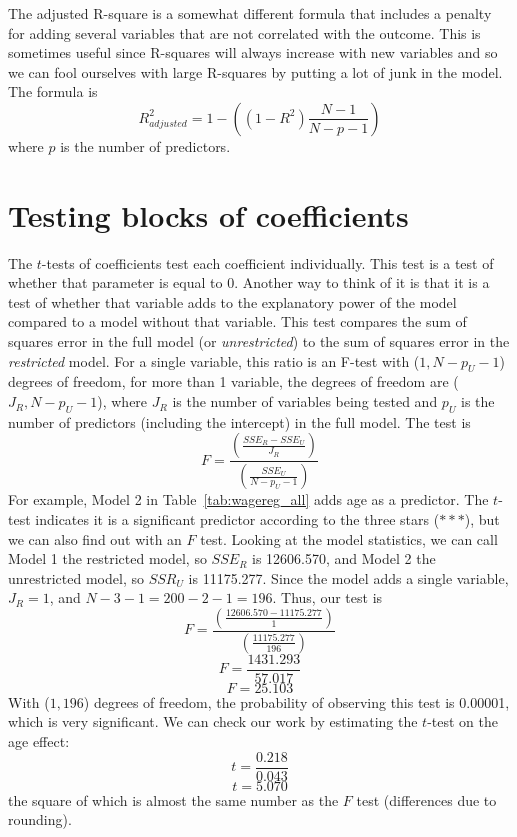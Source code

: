 The adjusted R-square is a somewhat different formula that includes a penalty for adding several variables that are not correlated with the outcome. This is sometimes useful since R-squares will always increase with new variables and so we can fool ourselves with large R-squares by putting a lot of junk in the model. The formula is
\begin{equation}
R_{adjusted}^2=1-\left(\left(1-R^2\right)\frac{N-1}{N-p-1}\right)
\end{equation}
where $p$ is the number of predictors.
\section{Testing blocks of coefficients}
The $t$-tests of coefficients test each coefficient individually. This test is a test of whether that parameter is equal to 0. Another way to think of it is that it is a test of whether that variable adds to the explanatory power of the model compared to a model without that variable. This test compares the sum of squares error in the full model (or {\it unrestricted}) to the sum of squares error in the {\it restricted} model. For a single variable, this ratio is an F-test with ($1,N-p_U-1$) degrees of freedom, for more than 1 variable, the degrees of freedom are ($J_R,N-p_U-1$), where $J_R$ is the number of variables being tested and $p_U$ is the number of predictors (including the intercept) in the full model. The test is
\begin{equation}
F=\frac{\left(\frac{SSE_R-SSE_U}{J_R}\right)}{\left(\frac{SSE_U}{N-p_U-1}\right)}
\end{equation}
For example, Model 2 in Table~\ref{tab:wagereg_all} adds age as a predictor. The $t$-test indicates it is a significant predictor according to the three stars ($***$), but we can also find out with an $F$ test. Looking at the model statistics, we can call Model 1 the restricted model, so $SSE_R$ is 12606.570, and Model 2 the unrestricted model, so $SSR_U$ is 11175.277. Since the model adds a single variable, $J_R = 1$, and $N-3-1 = 200-2-1 = 196$. Thus, our test is
\[
F=\frac{\left(\frac{12606.570-11175.277}{1}\right)}{\left(\frac{11175.277}{196}\right)}
\]
\[
F=\frac{1431.293}{57.017}
\]
\[
F=25.103
\]
With ($1,196$) degrees of freedom, the probability of observing this test is 0.00001, which is very significant. We can check our work by estimating the $t$-test on the age effect:
\[
t=\frac{0.218}{0.043}
\]
\[
t=5.070
\]
the square of which is almost the same number as the $F$ test (differences due to rounding).

